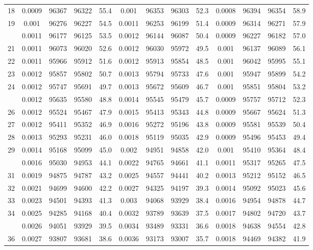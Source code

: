 \documentclass[
  14pt,
]{article}
\begin{document}
\begin{longtable}[t]{lcccccccccccc}
18 & 0.0009 & 96367 & 96322 & 55.4 & 0.001 & 96353 & 96303 & 52.3 & 0.0008 & 96394 & 96354 & 58.9\\
19 & 0.001 & 96276 & 96227 & 54.5 & 0.0011 & 96253 & 96199 & 51.4 & 0.0009 & 96314 & 96271 & 57.9\\
\addlinespace
20 & 0.0011 & 96177 & 96125 & 53.5 & 0.0012 & 96144 & 96087 & 50.4 & 0.0009 & 96227 & 96182 & 57.0\\
21 & 0.0011 & 96073 & 96020 & 52.6 & 0.0012 & 96030 & 95972 & 49.5 & 0.001 & 96137 & 96089 & 56.1\\
22 & 0.0011 & 95966 & 95912 & 51.6 & 0.0012 & 95913 & 95854 & 48.5 & 0.001 & 96042 & 95995 & 55.1\\
23 & 0.0012 & 95857 & 95802 & 50.7 & 0.0013 & 95794 & 95733 & 47.6 & 0.001 & 95947 & 95899 & 54.2\\
24 & 0.0012 & 95747 & 95691 & 49.7 & 0.0013 & 95672 & 95609 & 46.7 & 0.001 & 95851 & 95804 & 53.2\\
\addlinespace
25 & 0.0012 & 95635 & 95580 & 48.8 & 0.0014 & 95545 & 95479 & 45.7 & 0.0009 & 95757 & 95712 & 52.3\\
26 & 0.0012 & 95524 & 95467 & 47.9 & 0.0015 & 95413 & 95343 & 44.8 & 0.0009 & 95667 & 95624 & 51.3\\
27 & 0.0012 & 95411 & 95352 & 46.9 & 0.0016 & 95272 & 95196 & 43.8 & 0.0009 & 95581 & 95539 & 50.4\\
28 & 0.0013 & 95293 & 95231 & 46.0 & 0.0018 & 95119 & 95035 & 42.9 & 0.0009 & 95496 & 95453 & 49.4\\
29 & 0.0014 & 95168 & 95099 & 45.0 & 0.002 & 94951 & 94858 & 42.0 & 0.001 & 95410 & 95364 & 48.4\\
\addlinespace
30 & 0.0016 & 95030 & 94953 & 44.1 & 0.0022 & 94765 & 94661 & 41.1 & 0.0011 & 95317 & 95265 & 47.5\\
31 & 0.0019 & 94875 & 94787 & 43.2 & 0.0025 & 94557 & 94441 & 40.2 & 0.0013 & 95212 & 95152 & 46.5\\
32 & 0.0021 & 94699 & 94600 & 42.2 & 0.0027 & 94325 & 94197 & 39.3 & 0.0014 & 95092 & 95023 & 45.6\\
33 & 0.0023 & 94501 & 94393 & 41.3 & 0.003 & 94068 & 93929 & 38.4 & 0.0016 & 94954 & 94878 & 44.7\\
34 & 0.0025 & 94285 & 94168 & 40.4 & 0.0032 & 93789 & 93639 & 37.5 & 0.0017 & 94802 & 94720 & 43.7\\
\addlinespace
35 & 0.0026 & 94051 & 93929 & 39.5 & 0.0034 & 93489 & 93331 & 36.6 & 0.0018 & 94638 & 94554 & 42.8\\
36 & 0.0027 & 93807 & 93681 & 38.6 & 0.0036 & 93173 & 93007 & 35.7 & 0.0018 & 94469 & 94382 & 41.9\\

\end{longtable}
\end{document}
